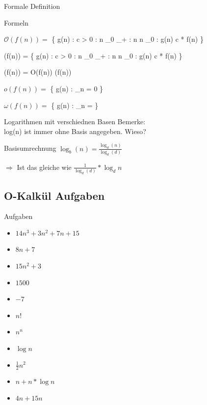 \documentclass[18pt]{beamer}
\begin{document}
	\begin{frame}{Formale Definition}
				
		\begin{block} {Formeln}	
				\item $\mathcal{O}(f(n)) = $ \{ g(n) : \exists c >  0 : \exists  n _{0} \in {} _{+} : \all n \geq n _{0} : g(n) \leq c * f(n) \} \\
				\item \Omega(f(n)) = \{ g(n) : \exists c >  0 : \exists  n _{0} \in {} _{+} : \all n \geq n _{0} : g(n) \leq c * f(n) \}\\

				\item \Theta(f(n)) = O(f(n))   \cap   \Omega(f(n))
			
				\item $o(f(n)) = $ \{ g(n) : \lim _{n \to \infty}  = 0 \}

				\item $\omega(f(n)) = $ \{ g(n) : \lim _{n \to \infty}  = \infty \}

							
		\end{block}	

	\end{frame}

	\begin{frame}{Logarithmen mit verschiednen Basen}
		Bemerke: \\
		log(n) ist immer ohne Basis angegeben. Wieso?

		\begin{block} {Basisumrechnung}
			$ \log _{b} (n) = \frac{\log _{d} (n)}{\log _{d}(d)} $
		\end{block}

		\centerline{$\Rightarrow$ Ist das gleiche wie $ \frac{1}{\log _{d}(d)} * \log _{d} n $}
	\end{frame}

	\subsection{O-Kalkül Aufgaben}

	\begin{frame}{Aufgaben}
		\begin{itemize}
			\item $ 14 n ^{3} + 3 n ^{2}  + 7n + 15$
			\item $ 8 n + 7 $
			\item $ 15 n ^{2} + 3 $
			\item $ 1500 $
			\item $ -7 $
			\item $ n! $
			\item $ n ^{n} $
			\item $ \log{n} $
			\item $ \frac{1}{2} n ^{2} $
			\item $ n + n * \log{n} $
			\item $ 4 n + 15 n $	
		\end{itemize}	
	\end{frame}
\end{document}
